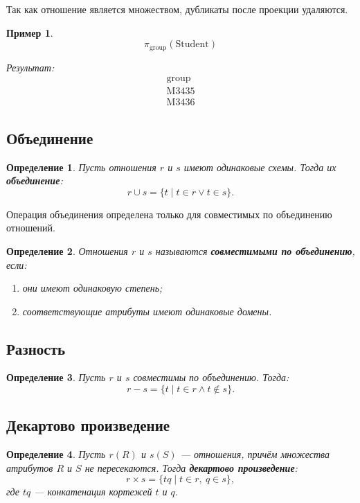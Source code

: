 \documentclass[12pt,a4paper]{article}
\newtheorem{definition}{Определение}[section]
\newtheorem{example}{Пример}[section]
\theoremstyle{remark}
\begin{document}
Так как отношение является множеством, дубликаты после проекции удаляются.

\begin{example}
\[
\pi_{\text{group}}(\text{Student})
\]

Результат:
\[
\begin{array}{c}
\text{group} \\
\hline
\text{M3435} \\
\text{M3436}
\end{array}
\]
\end{example}

\subsection{Объединение}

\begin{definition}
Пусть отношения $r$ и $s$ имеют одинаковые схемы. Тогда их \textbf{объединение}:
\[
r \cup s = \{t \mid t \in r \vee t \in s\}.
\]
\end{definition}

Операция объединения определена только для совместимых по объединению отношений.

\begin{definition}
Отношения $r$ и $s$ называются \textbf{совместимыми по объединению}, если:
\begin{enumerate}
    \item они имеют одинаковую степень;
    \item соответствующие атрибуты имеют одинаковые домены.
\end{enumerate}
\end{definition}

\subsection{Разность}

\begin{definition}
Пусть $r$ и $s$ совместимы по объединению. Тогда:
\[
r - s = \{t \mid t \in r \wedge t \notin s\}.
\]
\end{definition}

\subsection{Декартово произведение}

\begin{definition}
Пусть $r(R)$ и $s(S)$ --- отношения, причём множества атрибутов $R$ и $S$ не пересекаются. Тогда \textbf{декартово произведение}:
\[
r \times s = \{tq \mid t \in r,\ q \in s\},
\]
где $tq$ --- конкатенация кортежей $t$ и $q$.
\end{definition}
\end{document}
